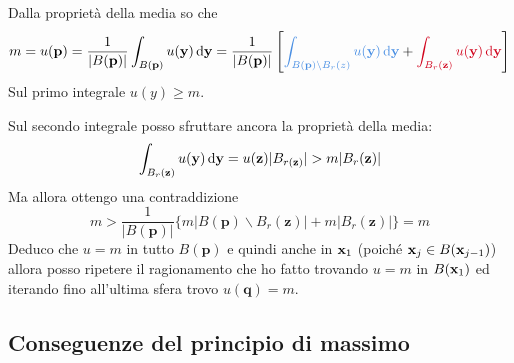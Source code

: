\begin{dimostrazione}
\begin{figure}[H]
\begin{tikzpicture}[x=0.75pt,y=0.75pt,yscale=-1,xscale=1]
        \end{tikzpicture}
    \end{figure}
    \FloatBarrier

    Dalla proprietà della media so che
    \begin{equation*}
        m=u(\mathbf{p}) =\frac{1}{| B(\mathbf{p})| }\int _{B(\mathbf{p})} u(\y) \dyy=\frac{1}{| B(\mathbf{p})| }\left[\textcolor[rgb]{0.29,0.56,0.89}{\int _{B(\mathbf{p}) \backslash B_{r}(z)} u(\y) \dyy} +\textcolor[rgb]{0.82,0.01,0.11}{\int _{B_{r}(\mathbf{z})} u(\y) \dyy}\right]
    \end{equation*}
    Sul primo integrale $u(y) \geq m$.

    Sul secondo integrale posso sfruttare ancora la proprietà della media:
    \begin{equation*}
        \int _{B_{r}(\mathbf{z})} u(\y) \dyy=u(\mathbf{z})| B_{r(\mathbf{z})}|  >m| B_{r}(\mathbf{z})|
    \end{equation*}
    Ma allora ottengo una contraddizione
    \begin{equation*}
        m >\frac{1}{| B(\mathbf{p})| }\{m| B(\mathbf{p}) \backslash B_{r}(\mathbf{z})| +m| B_{r}(\mathbf{z})| \} =m
    \end{equation*}
    Deduco che $u=m$ in tutto $B(\mathbf{p})$ e quindi anche in $\x_{1}$ (poiché $\x_{j} \in B(\x_{j-1})$) allora posso ripetere il ragionamento che ho fatto trovando $u=m$ in $B(\x_{1})$ ed iterando fino all'ultima sfera trovo $u(\mathbf{q}) =m$.
\end{dimostrazione}
\subsection{Conseguenze del principio di massimo}

